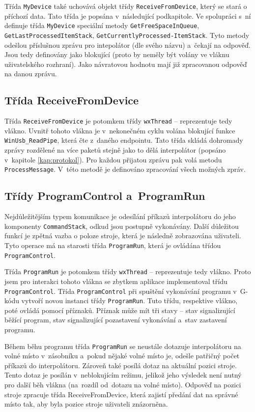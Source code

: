 		Třída {\tt MyDevice} také uchovává objekt třídy {\tt ReceiveFromDevice}, který se stará o příchozí data. Tato třída je popsána v~následující podkapitole. Ve spolupráci s~ní definuje třída {\tt MyDevice} speciální metody {\tt GetFreeSpaceInQueue}, {\tt GetLastProcessedItemStack}, {\tt GetCurrentlyProcessed-ItemStack}. Tyto metody odešlou příslušnou zprávu pro intepolátor (dle svého názvu) a~čekají na odpověď. Jsou tedy definovány jako blokující (proto by neměly být volány ve vláknu uživatelského rozhraní). Jako návratovou hodnotu mají již zpracovanou odpověď na danou zprávu.
		
		\subsection{Třída ReceiveFromDevice}
		
		Třída {\tt ReceiveFromDevice} je potomkem třídy {\tt wxThread} -- reprezentuje tedy vlákno. Uvnitř tohoto vlákna je v~nekonečném cyklu volána blokující funkce {\tt WinUsb\_ReadPipe}, která čte z~daného endpointu. Tato třída skládá dohromady zprávy rozdělené na více paketů stejně jako to dělá interpolátor (popsáno v~kapitole \ref{kap:protokol}). Pro každou přijatou zprávu pak volá metodu {\tt ProcessMessage}. V~této metodě je definováno zpracování všech možných zpráv.
		
		\subsection{Třídy ProgramControl a~ProgramRun}
		
		Nejdůležitějším typem komunikace je odesílání příkazů interpolátoru do jeho komponenty {\tt CommandStack}, odkud jsou postupně vykonávány. Další důležitou funkcí je zpětná vazba o poloze stroje, která je následně zobrazována uživateli. Tyto operace má na starosti třída {\tt ProgramRun}, která je ovládána třídou {\tt ProgramControl}.
		
		Třída {\tt ProgramRun} je potomkem třídy {\tt wxThread} -- reprezentuje tedy vlákno. Proto jsem pro interakci tohoto vlákna se zbytkem aplikace implementoval třídu {\tt ProgramControl}. Třída {\tt ProgramControl} při spuštění vykonávání programu v~G-kódu vytvoří novou instanci třídy {\tt ProgramRun}. Tuto třídu, respektive vlákno, poté ovládá pomocí příznaků. Příznak může mít tři stavy -- stav signalizující běžící program, stav signalizující pozastavení vykonávání a~stav zastavení programu.
		
		Během běhu programu třída {\tt ProgramRun} se neustále dotazuje interpolátoru na volné místo v~zásobníku a~pokud nějaké volné místo je, odešle patřičný počet příkazů do interpolátoru. Zároveň také posílá dotaz na aktuální pozici stroje. Tento dotaz je posílán v~neblokujícím režimu, jelikož jeho výsledek není nutný pro další běh vlákna (na~rozdíl od~dotazu na volné místo). Odpověď na pozici stroje zpracuje třída ReceiveFromDevice, která zajistí předání dat na správné místo tak, aby byla pozice stroje uživateli znázorněna.
		

